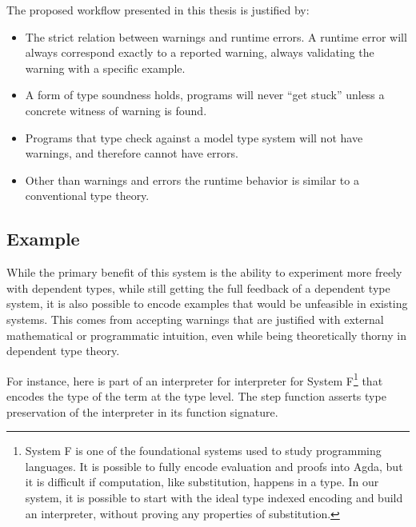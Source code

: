 The proposed workflow presented in this thesis is justified by:
\begin{itemize}
\item The strict relation between warnings and runtime errors.
A runtime error will always correspond exactly to a reported warning, always validating the warning with a specific example.
\item A form of type soundness holds, programs will never ``get stuck'' unless a concrete witness of warning is found.
\item Programs that type check against a model type system will not have warnings, and therefore cannot have errors.
\item Other than warnings and errors the runtime behavior is similar to a conventional type theory.
\end{itemize}

\subsection{Example}

While the primary benefit of this system is the ability to experiment more freely with dependent types, while still getting the full feedback of a dependent type system, it is also possible to encode examples that would be unfeasible in existing systems.
This comes from accepting warnings that are justified with external mathematical or programmatic intuition, even while being theoretically thorny in dependent type theory.

For instance, here is part of an interpreter for interpreter for System F\footnote{
 System F is one of the foundational systems used to study programming languages.
 It is possible to fully encode evaluation and proofs into Agda, but it is difficult if computation, like substitution, happens in a type.
 In our system, it is possible to start with the ideal type indexed encoding and build an interpreter, without proving any properties of substitution.
} that encodes the type of the term at the type level.
The step function asserts type preservation of the interpreter in its function signature.

